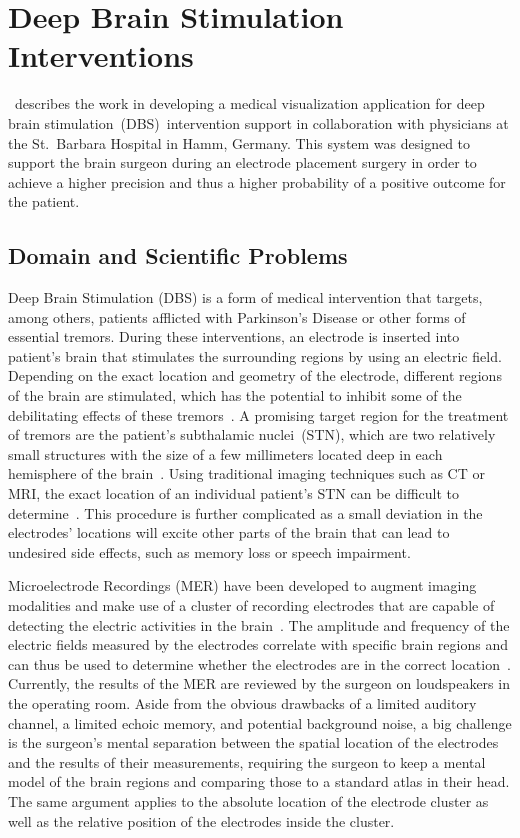 \section{Deep Brain Stimulation Interventions} \label{contributions:dbs}
\paperDBS\ describes the work in developing a medical visualization application for deep brain stimulation~(DBS)~intervention support in collaboration with physicians at the St.~Barbara Hospital in Hamm, Germany.  This system was designed to support the brain surgeon during an electrode placement surgery in order to achieve a higher precision and thus a higher probability of a positive outcome for the patient.



\subsection{Domain and Scientific Problems} \label{contributions:dbs:background}
Deep Brain Stimulation (DBS) is a form of medical intervention that targets, among others, patients afflicted with Parkinson's Disease or other forms of essential tremors.  During these interventions, an electrode is inserted into patient's brain that stimulates the surrounding regions by using an electric field.  Depending on the exact location and geometry of the electrode, different regions of the brain are stimulated, which has the potential to inhibit some of the debilitating effects of these tremors~\cite{lindberg2002impact}.  A promising target region for the treatment of tremors are the patient's subthalamic nuclei~(STN), which are two relatively small structures with the size of a few millimeters located deep in each hemisphere of the brain~\cite{benabid2009deep, richter2004determining}.  Using traditional imaging techniques such as CT or MRI, the exact location of an individual patient's STN can be difficult to determine~\cite{starr2002implantation}.  This procedure is further complicated as a small deviation in the electrodes' locations will excite other parts of the brain that can lead to undesired side effects, such as memory loss or speech impairment.

Microelectrode Recordings (MER) have been developed to augment imaging modalities and make use of a cluster of recording electrodes that are capable of detecting the electric activities in the brain~\cite{lenz1988methods}.  The amplitude and frequency of the electric fields measured by the electrodes correlate with specific brain regions and can thus be used to determine whether the electrodes are in the correct location~\cite{benazzouz2002intraoperative}.  Currently, the results of the MER are reviewed by the surgeon on loudspeakers in the operating room.  Aside from the obvious drawbacks of a limited auditory channel, a limited echoic memory, and potential background noise, a big challenge is the surgeon's mental separation between the spatial location of the electrodes and the results of their measurements, requiring the surgeon to keep a mental model of the brain regions and comparing those to a standard atlas in their head.  The same argument applies to the absolute location of the electrode cluster as well as the relative position of the electrodes inside the cluster.

